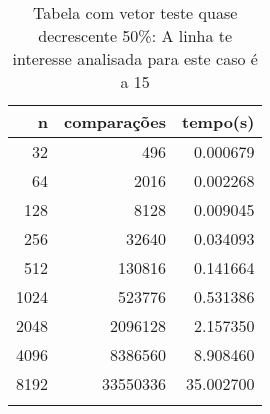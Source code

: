 \begin{table}[ht]
\centering
\begin{tabular}{rrr} \toprule
        n &    comparações &       tempo(s) \\ \midrule
      32  &            496 &      0.000679 \\
      64  &           2016 &      0.002268 \\
     128  &           8128 &      0.009045 \\
     256  &          32640 &      0.034093 \\
     512  &         130816 &      0.141664 \\
    1024  &         523776 &      0.531386 \\
    2048  &        2096128 &      2.157350 \\
    4096  &        8386560 &      8.908460 \\
    8192  &       33550336 &     35.002700 \\
\bottomrule\addlinespace
\end{tabular}
\caption{Tabela com vetor teste quase decrescente 50\%: A linha te interesse analisada para este caso é a 15}
\label{tab:selectionsortQuaseDecresc50}
\end{table}
